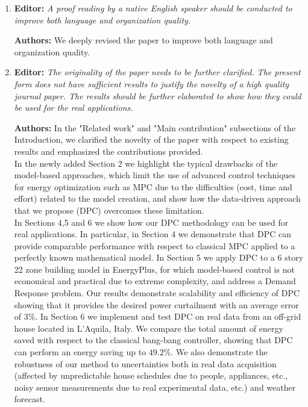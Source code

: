 \documentclass{article}
\begin{document}
\begin{enumerate}
	\item \textbf{Editor:} \textit{A proof reading by a native English speaker should be conducted to improve both language and organization quality.}



	\textbf{Authors:} We deeply revised the paper to improve both language and organization quality.



	\item \textbf{Editor:} \textit{The originality of the paper needs to be further clarified. The present form does not have sufficient results to justify the novelty of a high quality journal paper. The results should be further elaborated to show how they could be used for the real applications.}



	\textbf{Authors:} In the "Related work" and "Main contribution" subsections of the Introduction, we clarified the novelty of the paper with respect to existing results and emphasized the contributions provided.\\
		In the newly added Section 2 we highlight the typical drawbacks of the model-based approaches, which limit the use of advanced control techniques for energy optimization such as MPC due to the difficulties (cost, time and effort) related to the model creation, and show how the data-driven approach that we propose (DPC) overcomes these limitation.\\
		In Sections 4,5 and 6 we show how our DPC methodology can be used for real applications. In particular, in Section 4 we demonstrate that DPC can provide comparable performance with respect to classical MPC applied to a perfectly known mathematical model. In Section 5 we apply DPC to a 6 story 22 zone building model in EnergyPlus, for which model-based control is not economical and practical due to extreme complexity, and address a Demand Response problem. Our results demonstrate scalability and efficiency of DPC showing that it provides the desired power curtailment with an average error of 3\%. In Section 6 we implement and test DPC on real data from an off-grid house located in L'Aquila, Italy. We compare the total amount of energy saved with respect to the classical bang-bang controller, showing that DPC can perform an energy saving up to $49.2\%$. We also demonstrate the robustness of our method to uncertainties both in real data acquisition (affected by unpredictable house schedules due to people, appliances, etc., noisy sensor measurements due to real experimental data, etc.) and weather forecast.
\end{enumerate}
\end{document}
